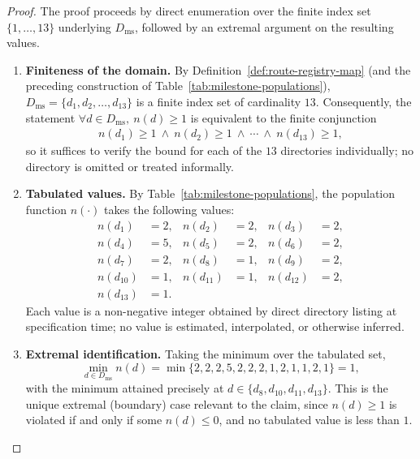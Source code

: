 \documentclass[12pt]{article}
\theoremstyle{definition}
\begin{document}
\begin{proof}
The proof proceeds by direct enumeration over the finite index set
$\{1, \dots, 13\}$ underlying $D_{\mathrm{ms}}$, followed by an
extremal argument on the resulting values.

\begin{enumerate}
      \item \textbf{Finiteness of the domain.} By
      Definition~\ref{def:route-registry-map} (and the preceding
      construction of Table~\ref{tab:milestone-populations}),
      $D_{\mathrm{ms}} = \{d_1, d_2, \dots, d_{13}\}$ is a finite
      index set of cardinality $13$. Consequently, the statement
      $\forall d \in D_{\mathrm{ms}},\ n(d) \ge 1$ is equivalent to
      the finite conjunction
      \begin{align*}
            n(d_1) \ge 1 \ \wedge\ n(d_2) \ge 1
            \ \wedge\ \cdots\ \wedge\ n(d_{13}) \ge 1,
      \end{align*}
      so it suffices to verify the bound for each of the $13$
      directories individually; no directory is omitted or treated
      informally.

      \item \textbf{Tabulated values.} By
      Table~\ref{tab:milestone-populations}, the population function
      $n(\cdot)$ takes the following values:
      \begin{align*}
            n(d_1) &= 2, &
            n(d_2) &= 2, &
            n(d_3) &= 2, \\
            n(d_4) &= 5, &
            n(d_5) &= 2, &
            n(d_6) &= 2, \\
            n(d_7) &= 2, &
            n(d_8) &= 1, &
            n(d_9) &= 2, \\
            n(d_{10}) &= 1, &
            n(d_{11}) &= 1, &
            n(d_{12}) &= 2, \\
            n(d_{13}) &= 1. & &
      \end{align*}
      Each value is a non-negative integer obtained by direct
      directory listing at specification time; no value is
      estimated, interpolated, or otherwise inferred.

      \item \textbf{Extremal identification.} Taking the minimum over
      the tabulated set,
      \begin{equation*}
            \min_{d \in D_{\mathrm{ms}}} n(d)
            = \min\{2, 2, 2, 5, 2, 2, 2, 1, 2, 1, 1, 2, 1\} = 1,
      \end{equation*}
      with the minimum attained precisely at
      $d \in \{d_8, d_{10}, d_{11}, d_{13}\}$. This is the unique
      extremal (boundary) case relevant to the claim, since $n(d) \ge
      1$ is violated if and only if some $n(d) \le 0$, and no
      tabulated value is less than $1$.


\end{enumerate}
\end{proof}
\end{document}

